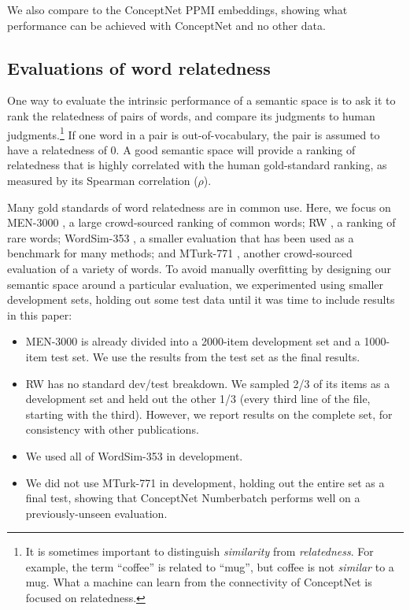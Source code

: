 \documentclass[letterpaper]{article}
\begin{document}
We also compare to the ConceptNet PPMI embeddings, showing what performance
can be achieved with ConceptNet and no other data.

\subsection{Evaluations of word relatedness}
\label{intrinsic-evaluations}

One way to evaluate the intrinsic performance of a semantic space is to ask it
to rank the relatedness of pairs of words, and compare its judgments to human
judgments.\footnote{It is sometimes important to distinguish \emph{similarity}
from \emph{relatedness}. For example, the term ``coffee'' is related to
``mug'', but coffee is not \emph{similar} to a mug. What a machine can learn
from the connectivity of ConceptNet is focused on relatedness.} If one word in
a pair is out-of-vocabulary, the pair is assumed to have a relatedness of 0. A
good semantic space will provide a ranking of relatedness that is highly
correlated with the human gold-standard ranking, as measured by its Spearman
correlation ($\rho$).

Many gold standards of word relatedness are in common use. Here, we focus on
MEN-3000 \cite{bruni2014men}, a large crowd-sourced ranking of common words; RW
\cite{luong2013rw}, a ranking of rare words; WordSim-353 \cite{finkelstein2001ws},
a smaller evaluation that has been used as a benchmark for many methods; and MTurk-771
\cite{halawi2012mturk}, another crowd-sourced evaluation of a variety of words.
To avoid manually overfitting by designing our semantic space around a
particular evaluation, we experimented using smaller development sets, holding
out some test data until it was time to include results in this paper:

\begin{itemize}
\item
    MEN-3000 is already divided into a 2000-item development set and a
    1000-item test set. We use the results from the test set as the final results.
\item
    RW has no standard dev/test breakdown. We sampled 2/3 of its items as
    a development set and held out the other 1/3 (every third line of the file,
    starting with the third). However, we report results on the complete set,
    for consistency with other publications.
\item
    We used all of WordSim-353 in development.
\item
    We did not use MTurk-771 in development, holding out the entire set
    as a final test, showing that ConceptNet Numberbatch performs well on a
    previously-unseen evaluation.
\end{itemize}
\end{document}
